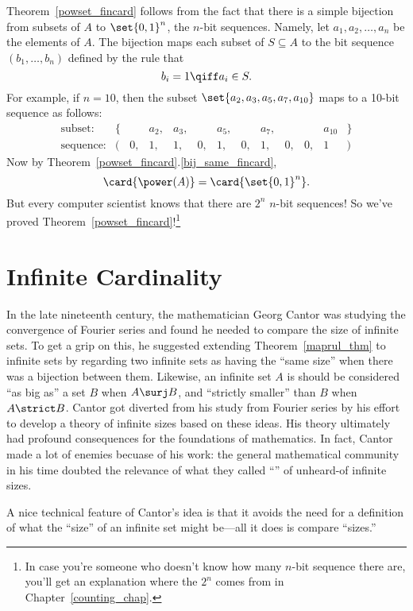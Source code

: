 Theorem~\ref{powset_fincard} follows from the fact that there is a
simple bijection from subsets of $A$ to $\set{0,1}^n$, the $n$-bit
sequences.  Namely, let $a_1, a_2, \dots, a_n$ be the elements of $A$.
The bijection maps each subset of $S \subseteq A$ to the bit sequence
$(b_1, \dots, b_n)$ defined by the rule that
\[
b_i = 1 \qiff a_i \in S.
\]
For example, if $n = 10$, then the subset $\set{a_2, a_3, a_5, a_7,
  a_{10}}$ maps to a 10-bit sequence as follows:
%
\[
\begin{array}{rrrrrrrrrrrrr}
\text{subset:} &
\{ &    & a_2, & a_3, &    & a_5, &   & a_7, &    &    & a_{10} & \} \\
\text{sequence:} &
(  & 0, &   1, &   1, & 0, &   1, & 0, &   1, & 0, & 0, &        1 & )
\end{array}
\]
%
Now by Theorem~\ref{powset_fincard}.\eqref{bij_same_fincard},
\[
\card{\power(A)} = \card{\set{0,1}^n}.
\]
But every computer scientist knows that there are $2^n$ $n$-bit sequences!
So we've proved Theorem~\ref{powset_fincard}!\footnote{In case you're
  someone who doesn't know how many $n$-bit sequence there are, you'll get
  an explanation where the $2^n$ comes from in Chapter~\ref{counting_chap}.}

\section{Infinite Cardinality}

In the late nineteenth century, the mathematician Georg Cantor was
studying the convergence of Fourier series and found he needed to
compare the size of infinite sets.  To get a grip on this, he
suggested extending Theorem~\ref{maprul_thm} to infinite sets by
regarding two infinite sets as having the ``same size'' when there was
a bijection between them.  Likewise, an infinite set $A$ is should be
considered ``as big as'' a set $B$ when $A \surj B$, and ``strictly
smaller'' than $B$ when $A \strict B$.  Cantor got diverted from his
study from Fourier series by his effort to develop a theory of
infinite sizes based on these ideas.  His theory ultimately had
profound consequences for the foundations of mathematics.  In fact,
Cantor made a lot of enemies becuase of his work: the general
mathematical community in his time doubted the relevance of what they
called ``'' of unheard-of infinite sizes.

A nice technical feature of Cantor's idea is that it avoids the need
for a definition of what the ``size'' of an infinite set might
be---all it does is compare ``sizes.''

